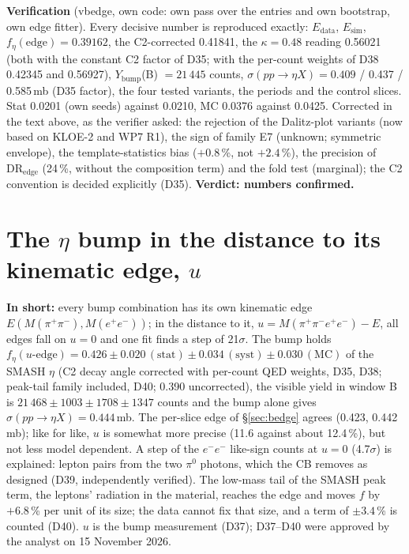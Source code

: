 \documentclass[11pt,a4paper]{article}
\newcommand{\piz}{\ensuremath{\pi^{0}}\xspace}
\newcommand{\Mfour}{\ensuremath{M(\pi^{+}\pi^{-}e^{+}e^{-})}\xspace}
\newcommand{\Mee}{\ensuremath{M(e^{+}e^{-})}\xspace}
\newcommand{\Mpipi}{\ensuremath{M(\pi^{+}\pi^{-})}\xspace}
\newcommand{\Ybump}{\ensuremath{Y_{\mathrm{bump}}}\xspace}
\newcommand{\sigeta}{\ensuremath{\sigma(pp\to\eta X)}\xspace}
\newcommand{\tipbox}[1]{\par\noindent\colorbox{blue!6}{\parbox{\dimexpr\linewidth-2\fboxsep\relax}{#1}}\par}
\newcommand{\inshort}[1]{\tipbox{\textbf{In short:} #1}}%
\begin{document}
\textbf{Verification} (vbedge, own code: own pass over the entries and own bootstrap, own edge fitter). Every decisive number is reproduced exactly: $E_{\mathrm{data}}$,
$E_{\mathrm{sim}}$, $f_\eta(\mathrm{edge})=0.39162$, the C2-corrected 0.41841, the $\kappa=0.48$ reading 0.56021 (both with the constant C2 factor of D35; with the
per-count weights of D38 0.42345 and 0.56927), \Ybump(B) $=21\,445$ counts, \sigeta $=0.409$ / 0.437 / 0.585\,mb (D35 factor), the four tested variants, the periods and the control slices. Stat 0.0201 (own seeds) against 0.0210, MC
0.0376 against 0.0425. Corrected in the text above, as the verifier asked: the rejection of the Dalitz-plot variants (now based on KLOE-2 and WP7
R1), the sign of family E7 (unknown; symmetric envelope), the template-statistics bias ($+0.8$\,\%, not $+2.4$\,\%), the precision of
$\mathrm{DR}_{\mathrm{edge}}$ (24\,\%, without the composition term) and the fold test (marginal); the C2 convention is decided explicitly (D35).
\textbf{Verdict: numbers confirmed.}

\section{The \texorpdfstring{$\eta$}{eta} bump in the distance to its kinematic edge, \texorpdfstring{$u$}{u}}
\label{sec:edgeu}
\inshort{every bump combination has its own kinematic edge $E(\Mpipi,\Mee)$; in the distance to it, $u=\Mfour-E$, all edges fall on $u=0$ and
one fit finds a step of 21$\sigma$. The bump holds $f_\eta(u\text{-edge})=0.426\pm0.020\,(\mathrm{stat})\pm0.034\,(\mathrm{syst})\pm0.030\,(\mathrm{MC})$
of the SMASH $\eta$ (C2 decay angle corrected with per-count QED weights, D35, D38; peak-tail family included, D40; 0.390 uncorrected), the visible
yield in window B is $21\,468\pm1003\pm1708\pm1347$ counts and the bump alone gives $\sigeta=0.444$\,mb. The per-slice edge of \S\ref{sec:bedge}
agrees (0.423, 0.442\,mb); like for like, $u$ is somewhat more precise (11.6 against about 12.4\,\%), but not less model dependent. A step of the
$e^-e^-$ like-sign counts at $u=0$ (4.7$\sigma$) is explained: lepton pairs from the two \piz photons, which the CB removes as designed (D39,
independently verified). The low-mass tail of the SMASH peak term, the leptons' radiation in the material, reaches the edge and moves $f$ by
$+6.8$\,\% per unit of its size; the data cannot fix that size, and a term of $\pm3.4$\,\% is counted (D40). $u$ is the bump measurement (D37);
D37--D40 were approved by the analyst on 15 November 2026.}
\end{document}
